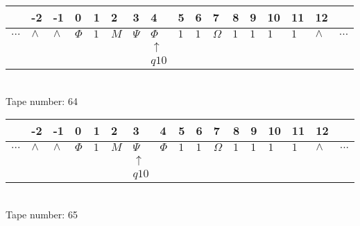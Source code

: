 \documentclass{article}
\begin{document}
\begin{table}[H]
\centering
\begin{tabular}{lllllllllllllllll}
 & -2 & -1 & 0 & 1 & 2 & 3 & 4 & 5 & 6 & 7 & 8 & 9 & 10 & 11 & 12 & \\
\hline
$...$ & \multicolumn{1}{|l|}{$\wedge$} & \multicolumn{1}{|l|}{$\wedge$} & \multicolumn{1}{|l|}{$\Phi$} & \multicolumn{1}{|l|}{$1$} & \multicolumn{1}{|l|}{$M$} & \multicolumn{1}{|l|}{$\Psi$} & \multicolumn{1}{|l|}{$\Phi$} & \multicolumn{1}{|l|}{$1$} & \multicolumn{1}{|l|}{$1$} & \multicolumn{1}{|l|}{$\Omega$} & \multicolumn{1}{|l|}{$1$} & \multicolumn{1}{|l|}{$1$} & \multicolumn{1}{|l|}{$1$} & \multicolumn{1}{|l|}{$1$} & \multicolumn{1}{|l|}{$\wedge$} & $...$\\
\hline
&  &  &  &  &  &  & $\uparrow$ &  &  &  &  &  &  &  &  &  \\
&  &  &  &  &  &  & $ q10 $ &  &  &  &  &  &  &  &  &  \\
\end{tabular}
\\
Tape number: 64
\noindent\makebox[\linewidth]{\hdashrule{\textwidth}{1pt}{1pt}}\end{table}

\begin{table}[H]
\centering
\begin{tabular}{lllllllllllllllll}
 & -2 & -1 & 0 & 1 & 2 & 3 & 4 & 5 & 6 & 7 & 8 & 9 & 10 & 11 & 12 & \\
\hline
$...$ & \multicolumn{1}{|l|}{$\wedge$} & \multicolumn{1}{|l|}{$\wedge$} & \multicolumn{1}{|l|}{$\Phi$} & \multicolumn{1}{|l|}{$1$} & \multicolumn{1}{|l|}{$M$} & \multicolumn{1}{|l|}{$\Psi$} & \multicolumn{1}{|l|}{$\Phi$} & \multicolumn{1}{|l|}{$1$} & \multicolumn{1}{|l|}{$1$} & \multicolumn{1}{|l|}{$\Omega$} & \multicolumn{1}{|l|}{$1$} & \multicolumn{1}{|l|}{$1$} & \multicolumn{1}{|l|}{$1$} & \multicolumn{1}{|l|}{$1$} & \multicolumn{1}{|l|}{$\wedge$} & $...$\\
\hline
&  &  &  &  &  & $\uparrow$ &  &  &  &  &  &  &  &  &  &  \\
&  &  &  &  &  & $ q10 $ &  &  &  &  &  &  &  &  &  &  \\
\end{tabular}
\\
Tape number: 65
\noindent\makebox[\linewidth]{\hdashrule{\textwidth}{1pt}{1pt}}\end{table}
\clearpage
\end{document}
